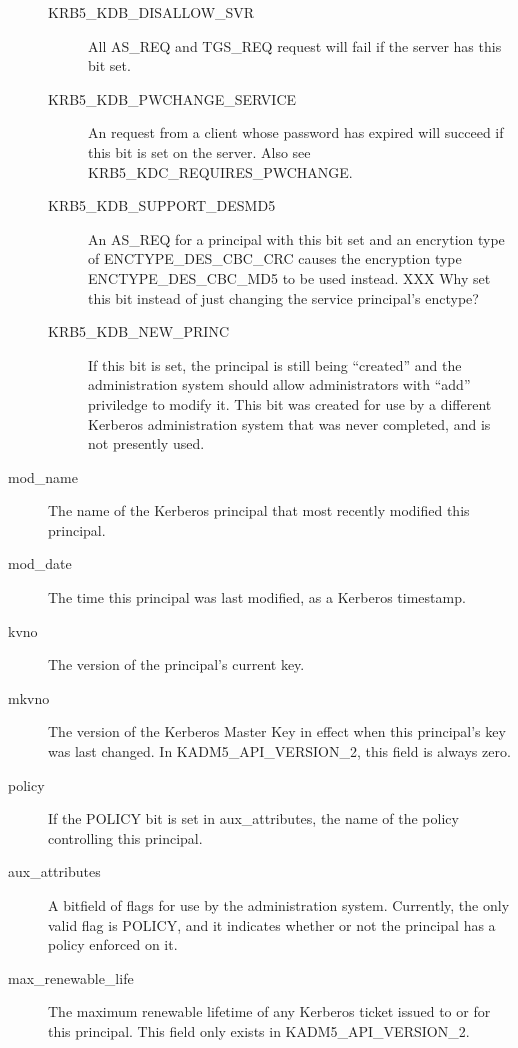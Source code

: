 \begin{description}
\begin{description}
\item[KRB5_KDB_DISALLOW_SVR] All AS_REQ and TGS_REQ request will fail
if the server has this bit set.

\item[KRB5_KDB_PWCHANGE_SERVICE] An request from a client whose
password has expired will succeed if this bit is set on the server.
Also see KRB5_KDC_REQUIRES_PWCHANGE.

\item[KRB5_KDB_SUPPORT_DESMD5] An AS_REQ for a principal with this bit
set and an encrytion type of ENCTYPE_DES_CBC_CRC causes the encryption
type ENCTYPE_DES_CBC_MD5 to be used instead.  XXX Why set this bit
instead of just changing the service principal's enctype?

\item[KRB5_KDB_NEW_PRINC] If this bit is set, the principal is still
being ``created'' and the administration system should allow
administrators with ``add'' priviledge to modify it.  This bit was
created for use by a different Kerberos administration system that was
never completed, and is not presently used.
\end{description}

\item[mod_name] The name of the Kerberos principal that most recently
modified this principal.

\item[mod_date] The time this principal was last modified, as a Kerberos
timestamp.

\item[kvno] The version of the principal's current key.

\item[mkvno] The version of the Kerberos Master Key in effect when
this principal's key was last changed.  In KADM5_API_VERSION_2, this
field is always zero.

\item[policy] If the POLICY bit is set in aux_attributes, the name
of the policy controlling this principal.

\item[aux_attributes]  A bitfield of flags for use by the
administration system.  Currently, the only valid flag is POLICY, and
it indicates whether or not the principal has a policy enforced on it.

\item[max_renewable_life] The maximum renewable lifetime of any
Kerberos ticket issued to or for this principal.  This field only
exists in KADM5_API_VERSION_2.


\end{description}
